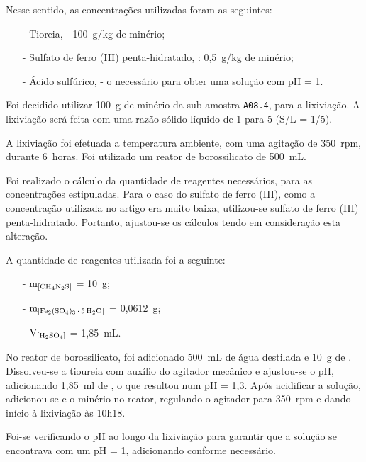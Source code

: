 Nesse sentido, as concentrações utilizadas foram as seguintes:
\begin{itemize}
    \item[-] Tioreia, \tioureia{} - 100~g/kg de minério;
    \item[-] Sulfato de ferro (III) penta-hidratado, \sulfe{}: 0,5~g/kg de minério;
    \item[-] Ácido sulfúrico, \acsul{} - o necessário para obter uma solução com pH = 1.
\end{itemize}

Foi decidido utilizar 100~g de minério da sub-amostra \texttt{A08.4}, para a lixiviação. 
A lixiviação será feita com uma razão sólido líquido de 1 para 5 (S/L = 1/5).

A lixiviação foi efetuada a temperatura ambiente, com uma agitação de 350~rpm, durante 6~horas.
Foi utilizado um reator de borossilicato de 500~mL.

Foi realizado o cálculo da quantidade de reagentes necessários, para as concentrações estipuladas. 
Para o caso do sulfato de ferro (III), como a concentração utilizada no artigo era muito baixa, utilizou-se sulfato de ferro (III) penta-hidratado. Portanto, ajustou-se os cálculos tendo em consideração esta alteração.

A quantidade de reagentes utilizada foi a seguinte:
\begin{itemize}
    \item[-] $\mathrm{m}_{\left[\tioureia{}\right]}$ = 10~g;
    \item[-] $\mathrm{m}_{\left[\sulfe{}\right]}$ = 0,0612~g;
    \item[-] $\mathrm{V}_{\left[\acsul{}\right]}$ = 1,85~mL.
\end{itemize}


No reator de borossilicato, foi adicionado 500~mL de água destilada e 10~g de \tioureia{}   .
Dissolveu-se a tioureia com auxílio do agitador mecânico e ajustou-se o pH, adicionando 1,85~ml de \acsul{}, o que resultou num pH = 1,3.
Após acidificar a solução, adicionou-se \sulfe{} e o minério no reator, regulando o agitador para 350~rpm e dando início à lixiviação às 10h18.

Foi-se verificando o pH ao longo da lixiviação para garantir que a solução se encontrava com um pH = 1, adicionando \acsul{} conforme necessário.

